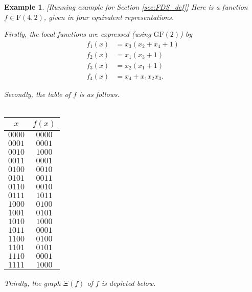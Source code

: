 \documentclass[a4paper, 11pt]{book}
\numberwithin{equation}{section}
\theoremstyle{plain}
\newtheorem{example}	[equation]	{Example}
\newcommand{\graph}{\Xi}
\newcommand{\functions}{\mathrm{F}}
\newcommand{\GF}{\mathrm{GF}}
\renewcommand{\(}{\ldbrack}
\renewcommand{\)}{\rdbrack}
\begin{document}
\begin{example}\label{ex:running_example_ch1}[Running example for Section \ref{sec:FDS_def}]
Here is a function $f \in \functions(4, 2)$, given in four equivalent representations.

Firstly, the local functions are expressed (using $\GF(2)$) by
\begin{align*}
	f_1(x) &= x_3 (x_2 + x_4 + 1)\\
	f_2(x) &= x_1 (x_3 + 1)\\
	f_3(x) &= x_2 (x_1 + 1)\\
	f_4(x) &= x_4 + x_1 x_2 x_3.
\end{align*}

Secondly, the table of $f$ is as follows.\\
~\\
\begin{tabular}{c|c}
	$x$ & $f(x)$\\
	\hline
	$0000$ & $0000$\\
	$0001$ & $0001$\\
	$0010$ & $1000$\\
	$0011$ & $0001$\\
	$0100$ & $0010$\\
	$0101$ & $0011$\\
	$0110$ & $0010$\\
	$0111$ & $1011$\\
	$1000$ & $0100$\\
	$1001$ & $0101$\\
	$1010$ & $1000$\\
	$1011$ & $0001$\\
	$1100$ & $0100$\\
	$1101$ & $0101$\\
	$1110$ & $0001$\\
	$1111$ & $1000$
\end{tabular}

Thirdly, the graph $\graph(f)$ of $f$ is depicted below.\\
~\\
\end{example}
\end{document}
